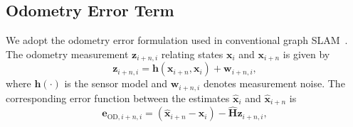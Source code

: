 \documentclass[conference]{IEEEtran}
\begin{document}
\subsection{Odometry Error Term}
We adopt the odometry error formulation used in conventional graph SLAM~\cite{graph_slam}.
The odometry measurement $\mathbf{z}_{i+n,i}$ relating states $\mathbf{x}_i$ and $\mathbf{x}_{i+n}$ is given by
\begin{equation}
    \mathbf{z}_{i+n,i} = \mathbf{h}(\mathbf{x}_{i+n}, \mathbf{x}_{i}) + \mathbf{w}_{i+n,i},
\end{equation}
where $\mathbf{h}(\cdot)$ is the sensor model and $\mathbf{w}_{i+n,i}$ denotes measurement noise.
The corresponding error function between the estimates $\mathbf{\hat{x}}_i$ and $\mathbf{\hat{x}}_{i+n}$ is
\begin{equation}
    \mathbf{e}_{\mathrm{OD},i+n,i} = \left(\mathbf{\hat{x}}_{i+n} - \mathbf{\hat{x}}_{i}\right) - \mathbf{\hat{H}}\mathbf{z}_{i+n,i},
\end{equation}
\end{document}
